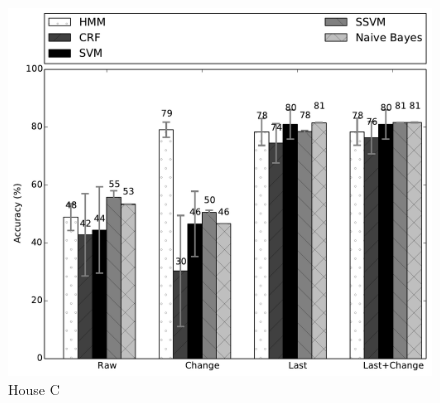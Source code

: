 \begin{figure}[t!]
\begin{center}
\includegraphics[width=5in]{../../src/reports/C.pdf}
\end{center}
\vspace{-0.5cm}
\caption{House C}
\label{fig:house_3}
\vspace{-0.5cm}
\end{figure}

